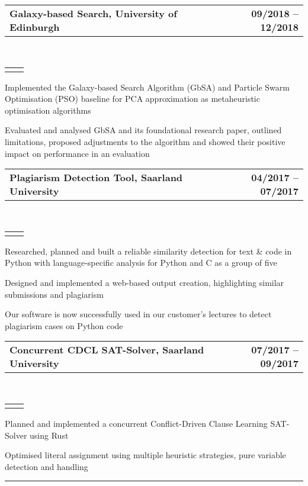 \documentclass[]{lukas-cv}
\makeatletter
\newcommand{\headerrow}[2]
{\begin{tabular*}{\linewidth}{l@{\extracolsep{\fill}}r}
	\fontspec{Helvetica}\fontsize{12pt}{12pt}\selectfont\bfseries{\color{subheadings}#1} &
	\fontspec{Helvetica}\fontsize{12pt}{12pt}\selectfont\bfseries{\color{subheadings}#2} \\
\end{tabular*}}
\newcommand{\locationrow}[2]
{\begin{tabular*}{\linewidth}{l@{\extracolsep{\fill}}r}
        \color{headings}\scshape\fontspec{Heiti TC Medium}\fontsize{10pt}{12pt}\selectfont{#1}  &
        \color{headings}\scshape\fontspec{Heiti TC Medium}\fontsize{10pt}{12pt}\selectfont{#2}  \\
\end{tabular*}}
\makeatother
\begin{document}
\noindent
\headerrow{Galaxy-based Search, University of Edinburgh}{09/2018 -- 12/2018}
\\
\locationrow{Group Project for Natural Computing Lecture}{}
\begin{tightitemize}{1.7em}
    \item Implemented the Galaxy-based Search Algorithm (GbSA) and Particle Swarm Optimisation (PSO) baseline 
    for PCA approximation as metaheuristic optimisation algorithms
    \item Evaluated and analysed GbSA and its foundational research paper, outlined limitations, proposed adjustments to 
    the algorithm and showed their positive impact on performance in an evaluation
\end{tightitemize}
\largesectionsep

\noindent
\headerrow{Plagiarism Detection Tool, Saarland University}{04/2017 -- 07/2017}
\\
\locationrow{Group Project for Software Engineering Lecture}{}
\begin{tightitemize}{1.7em}
    \item Researched, planned and built a reliable similarity detection for text \& code in Python with language-specific analysis for Python and C as a group of five
    \item Designed and implemented a web-based output creation, highlighting similar submissions and plagiarism
    \item Our software is now successfully used in our customer's lectures to detect plagiarism cases on Python code
\end{tightitemize}
\largesectionsep

\noindent
\headerrow{Concurrent CDCL SAT-Solver, Saarland University}{07/2017 -- 09/2017}
\\
\locationrow{Group Project for Modern Imperative Programming Languages Seminar}{}
\begin{tightitemize}{1.7em}
    \item Planned and implemented a concurrent Conflict-Driven Clause Learning SAT-Solver using Rust
    \item Optimised literal assignment using multiple heuristic strategies, pure variable detection and handling
\end{tightitemize}
\largesectionsep


\hrule
\vspace{0.4em}
\end{document}
